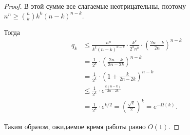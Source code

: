 \begin{proof}
	В этой сумме все слагаемые неотрицательны, поэтому $n^n \geq \binom{n}{k} k^k (n-k)^{n-k}.$
	
	
	Тогда
	\begin{align*}
		q_k
		&\leq
		\frac{n^n}{k^k (n-k)^{n-k}}
		\cdot
		\frac{k^k}{2^k n^k}
		\cdot
		\left(\frac{2n-k}{2n}\right)^{n-k}
		\\[4pt]
		&=
		\frac{1}{2^k}
		\cdot
		\left(\frac{2n-k}{2n-2k}\right)^{n-k}
		\\[4pt]
		&=
		\frac{1}{2^k}
		\cdot
		\left(1 + \frac{k}{2n-2k}\right)^{n-k}
		\\[4pt]
		&\leq
		\frac{1}{2^k}
		\cdot
		e^{\frac{k(n-k)}{2n-2k}}
		\\[4pt]
		&=
		\frac{1}{2^k}
		\cdot
		e^{k/2}
		=
		\left(\frac{\sqrt{e}}{2}\right)^k
		=
		e^{-\Omega(k)}.
	\end{align*}
	
	Таким образом, ожидаемое время работы равно $O(1)$.
\end{proof}
